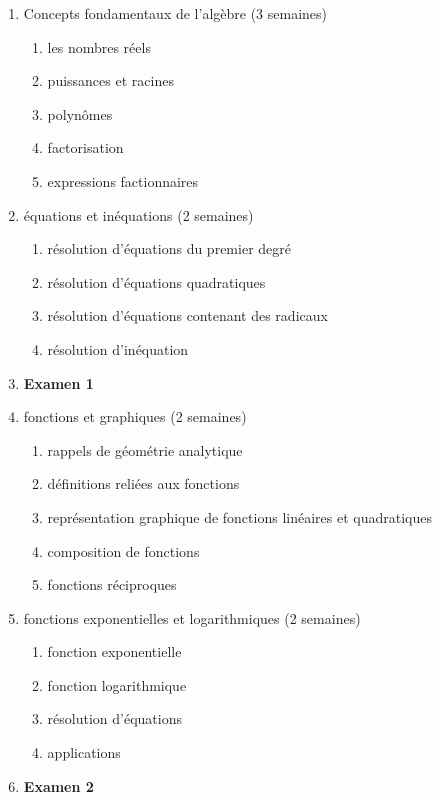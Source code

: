 \documentclass[fleqn,twoside,12pt,letterpaper]{article}
\begin{document}
  \begin{enumerate}
    \item Concepts fondamentaux de l'algèbre (3 semaines)
	  \begin{enumerate}
	    \item les nombres réels
		\item puissances et racines
		\item polynômes
		\item factorisation
		\item expressions factionnaires
	  \end{enumerate}
	
	\item équations et inéquations (2 semaines)
	  \begin{enumerate}
	    \item résolution d'équations du premier degré
		\item résolution d'équations quadratiques
		\item résolution d'équations contenant des radicaux
		\item résolution d'inéquation
	  \end{enumerate}
	
	\item {\bf Examen 1}
	
	\item fonctions et graphiques (2 semaines)
	  \begin{enumerate}
	    \item rappels de géométrie analytique
	    \item définitions reliées aux fonctions
	    \item représentation graphique de fonctions linéaires et
	    	      quadratiques
		\item composition de fonctions
		\item fonctions réciproques
	  \end{enumerate}
	
	\item fonctions exponentielles et logarithmiques (2 semaines)
	  \begin{enumerate}
	    \item fonction exponentielle
	    \item fonction logarithmique
	    \item résolution d'équations
	    \item applications
	  \end{enumerate}
	
	\item {\bf Examen 2}
	

\end{enumerate}
\end{document}
